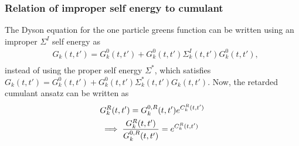 \subsubsection{Relation of improper self energy to cumulant}
The Dyson equation for the one particle greens function can be written using an improper $\Sigma^I$ self energy as
\begin{align}
    \label{dyson}
    & G_k(t,t') =G_k^0(t,t') + G_k^0(t,t')\Sigma_k^I(t,t')G_k^0(t,t'),\\
\end{align}
instead of using the proper self energy $\Sigma^*$, which satisfies $G_k(t,t') = G_k^0(t,t') + G_k^0(t,t')\Sigma_k^*(t,t')G_k(t,t').$ 
Now, the retarded cumulant ansatz can be written as
\begin{align}
&G_k^R(t,t') = G_k^{0,R}(t,t')e^{C_k^R(t,t')}\\
& \implies {G_k^R(t,t') \over G_k^{0,R}(t,t')} = e^{C_k^R(t,t')}\\
\end{align}
